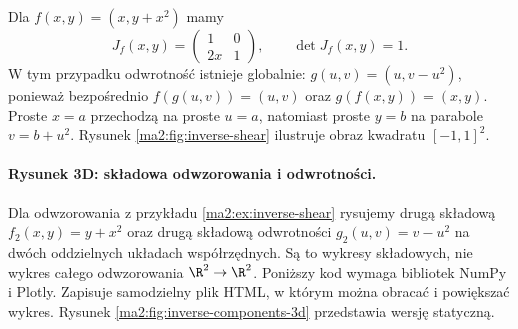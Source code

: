 \begin{przyklad}
\label{ma2:ex:inverse-shear}
Dla $f(x,y)=(x,y+x^2)$ mamy
\[
 J_f(x,y)=\begin{pmatrix}1&0\\2x&1\end{pmatrix},
 \qquad\det J_f(x,y)=1.
\]
W tym przypadku odwrotność istnieje globalnie:
$g(u,v)=(u,v-u^2)$, ponieważ bezpośrednio
$f(g(u,v))=(u,v)$ oraz $g(f(x,y))=(x,y)$.
Proste $x=a$ przechodzą na proste $u=a$,
natomiast proste $y=b$ na parabole $v=b+u^2$.
Rysunek \ref{ma2:fig:inverse-shear} ilustruje
obraz kwadratu $[-1,1]^2$.
\end{przyklad}

\paragraph{Rysunek 3D: składowa odwzorowania i odwrotności.}
Dla odwzorowania z przykładu \ref{ma2:ex:inverse-shear}
rysujemy drugą składową $f_2(x,y)=y+x^2$ oraz drugą
składową odwrotności $g_2(u,v)=v-u^2$ na dwóch
oddzielnych układach współrzędnych. Są to wykresy
składowych, nie wykres całego odwzorowania $\R^2\to\R^2$.
Poniższy kod wymaga bibliotek NumPy i Plotly. Zapisuje samodzielny
plik HTML, w którym można obracać i powiększać wykres.
Rysunek \ref{ma2:fig:inverse-components-3d} przedstawia wersję statyczną.

